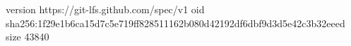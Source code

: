 version https://git-lfs.github.com/spec/v1
oid sha256:1f29e1b6ca15d7c5e719ff828511162b080d42192df6dbf9d3d5e42c3b32eeed
size 43840

